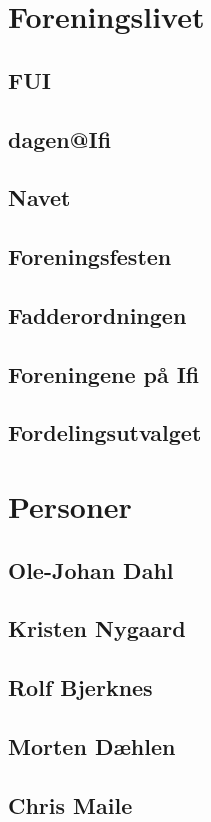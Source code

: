 \documentclass[12pt, a4paper]{book}
\begin{document}
\part{Foreningslivet}
\chapter{FUI}
\chapter{dagen@Ifi}
\chapter{Navet}
\chapter{Foreningsfesten}
\chapter{Fadderordningen}
\chapter{Foreningene på Ifi}
\chapter{Fordelingsutvalget}

\part{Personer}
\chapter{Ole-Johan Dahl}
\chapter{Kristen Nygaard}
\chapter{Rolf Bjerknes}
\chapter{Morten Dæhlen}
\chapter{Chris Maile}
\end{document}
